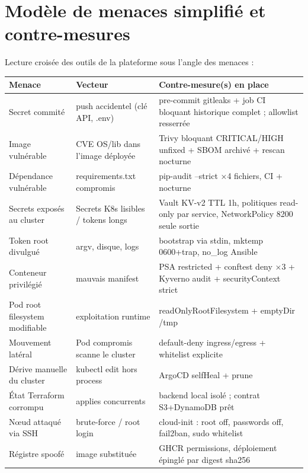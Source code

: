 \documentclass[12pt,a4paper,twoside,openright]{report}
\begin{document}
\section{Modèle de menaces simplifié et contre-mesures}

Lecture croisée des outils de la plateforme sous l'angle des menaces :

\begin{center}\label{tab:ch-modele-de-menaces-simplifie-et-contre-mesures}\end{center}
\begin{longtable}{@{}p{3.6cm}p{5.6cm}p{5.0cm}@{}}
\toprule
\textbf{Menace} & \textbf{Vecteur} & \textbf{Contre-mesure(s) en place} \\
\midrule
\endhead
Secret commité & push accidentel (clé API, .env) & pre-commit gitleaks + job CI bloquant historique complet ; allowlist resserrée \\
Image vulnérable & CVE OS/lib dans l'image déployée & Trivy bloquant CRITICAL/HIGH unfixed + SBOM archivé + rescan nocturne \\
Dépendance vulnérable & requirements.txt compromis & pip-audit --strict ×4 fichiers, CI + nocturne \\
Secrets exposés au cluster & Secrets K8s lisibles / tokens longs & Vault KV-v2 TTL 1h, politiques read-only par service, NetworkPolicy 8200 seule sortie \\
Token root divulgué & argv, disque, logs & bootstrap via stdin, mktemp 0600+trap, no\_log Ansible \\
Conteneur privilégié & mauvais manifest & PSA restricted + conftest deny ×3 + Kyverno audit + securityContext strict \\
Pod root filesystem modifiable & exploitation runtime & readOnlyRootFilesystem + emptyDir /tmp \\
Mouvement latéral & Pod compromis scanne le cluster & default-deny ingress/egress + whitelist explicite \\
Dérive manuelle du cluster & kubectl edit hors process & ArgoCD selfHeal + prune \\
État Terraform corrompu & applies concurrents & backend local isolé ; contrat S3+DynamoDB prêt \\
Nœud attaqué via SSH & brute-force / root login & cloud-init : root off, passwords off, fail2ban, sudo whitelist \\
Régistre spoofé & image substituée & GHCR permissions, déploiement épinglé par digest sha256 \\
\bottomrule
\end{longtable}
\end{document}
